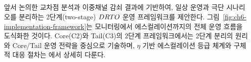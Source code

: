 \subsection{}
\label{subsec:two-stage-framework}

앞서 논의한 교차점 분석과 이중채널 감쇠 결과에 기반하여,
일상 운영과 극단 시나리오를 분리하는 2단계(two-stage) $DRTO$ 운영 프레임워크를
제안한다. \p{[}그림~\vref{fig:ch6-implementation-framework}\p{]}는 모니터링에서 에스컬레이션까지의
전체 운영 흐름을 도식화한 것이다.
Core(C2)와 Tail(C3)의 2단계 프레임워크에서는 2단계 분리의 원리와 Core/Tail 운영 전략을 중심으로 기술하며,
$\eta$ 기반 에스컬레이션 등급 체계와 구체적 대응 절차는
에서 상세히 다룬다.

